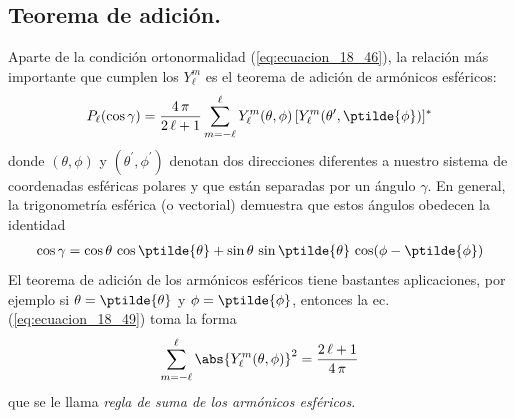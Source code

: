 \subsection{Teorema de adición.}
Aparte de la condición ortonormalidad (\ref{eq:ecuacion_18_46}), la relación más importante que cumplen los $Y_{\ell}^{m}$ es el teorema de adición de armónicos esféricos:
\begin{align}
P_{\ell} (\cos \gamma) = \dfrac{4 \, \pi}{2 \, \ell + 1} \sum_{m = -\ell}^{\ell} Y_{\ell}^{m} (\theta, \phi) \, [ Y_{\ell}^{m} (\theta^{\prime}, \ptilde{\phi})]^{*}
\label{eq:ecuacion_18_49}
\end{align}
donde $(\theta, \phi)$ y $(\theta^{\prime}, \phi^{\prime})$ denotan dos direcciones diferentes a nuestro sistema de coordenadas esféricas polares y que están separadas por un ángulo $\gamma$. En general, la trigonometría esférica (o vectorial) demuestra que estos ángulos obedecen la identidad
\begin{align}
\cos \gamma = \cos \theta \, \cos \ptilde{\theta} + \sin \theta \, \sin \ptilde{\theta} \, \cos (\phi - \ptilde{\phi})
\label{eq:ecuacion_18_50}
\end{align}
El teorema de adición de los armónicos esféricos tiene bastantes aplicaciones, por ejemplo si $\theta = \ptilde{\theta}$ y $\phi = \ptilde{\phi}$, entonces la ec. (\ref{eq:ecuacion_18_49}) toma la forma
\begin{align}
\sum_{m = -\ell}^{\ell} \abs{Y_{\ell}^{m} (\theta, \phi)}^{2} = \dfrac{2 \, \ell + 1}{4 \, \pi}
\label{eq:ecuacion_10_262}
\end{align}
que se le llama \emph{regla de suma de los armónicos esféricos}.
